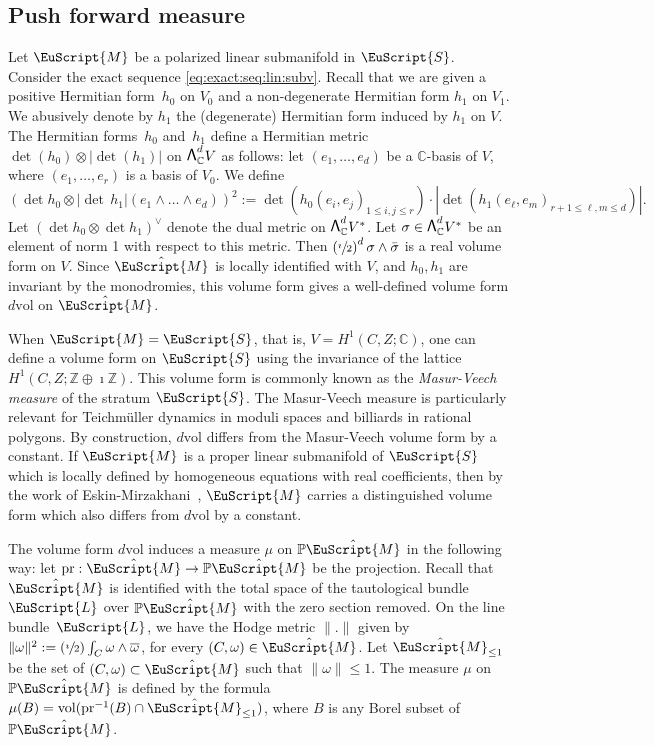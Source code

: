 \documentclass[10pt]{amsart}
\let\mathcal\EuScript
\newcommand\bw{{\hbox{\large$\mathsf{\Lambda}$}}}
\newcommand{\Psfrac}[2]{(\sfrac{#1}{#2})}
\theoremstyle{plain}
\theoremstyle{definition}
\def\C{\mathbb{C}}
\newcommand\Z{\mathbb{Z}}
\newcommand{\Pb}{\mathbb{P}}
\newcommand{\cL}{\mathcal{L}}
\newcommand{\cM}{\mathcal{M}}
\newcommand{\cS}{\mathcal{S}}
\newcommand{\vol}{\mathrm{vol}}
\newcommand{\pr}{\mathrm{pr}}
\let\omg\omega
\let\ol\overline
\begin{document}
\subsection{Push forward measure}\label{sec:push:measure}
Let $\cM$ be a polarized linear submanifold in $\cS$.
Consider the exact sequence \eqref{eq:exact:seq:lin:subv}.
Recall that we are given a positive Hermitian form~$h_0$ on $V_0$ and a non-degenerate Hermitian form $h_1$ on $V_1$. We abusively denote by $h_1$ the (degenerate) Hermitian form induced by $h_1$ on $V$.
The Hermitian forms~$h_0$ and~$h_1$ define a Hermitian metric $\det(h_0)\otimes|{\det}(h_1)|$ on $\bw^d_\C V$ as follows: let $(e_1,\dots,e_d)$ be a $\C$-basis of $V$, where $(e_1,\dots,e_r)$ is a basis of $V_0$. We define
\[
(\det h_0\otimes|{\det\,} h_1|(e_1\wedge\dots\wedge e_d))^2:=\det(h_0(e_i,e_j)_{1\leq i,j\leq r})\cdot|{\det}(h_1(e_\ell,e_m)_{r+1\leq \ell,m\leq d})|.
\]
Let $(\det h_0\otimes \det h_1)^\vee$ denote the dual metric on $\bw^d_\C V^*$.
Let $\sigma \in \bw^d_\C V^*$ be an element of norm 1 with respect to this metric.
Then $\left(\sfrac{\imath}{2}\right)^d\sigma\wedge\bar{\sigma}$ is a real volume form on $V$.
Since $\hat{\cM}$ is locally identified with $V$, and $h_0,h_1$ are invariant by the monodromies, this volume form gives a well-defined volume form $d\vol$ on $\hat{\cM}$.

When $\cM=\cS$, that is, $V=H^1(C,Z;\C)$, one can define a volume form on $\cS$ using the invariance of the lattice $H^1(C,Z;\Z\oplus\imath\Z)$.
This volume form is commonly known as the \emph{Masur-Veech measure} of the stratum $\cS$.
The Masur-Veech measure is particularly relevant for Teichmüller dynamics in moduli spaces and billiards in rational polygons.
By construction, $d\vol$ differs from the Masur-Veech volume form by a constant.
If $\cM$ is a proper linear submanifold of $\cS$ which is locally defined by homogeneous equations with real coefficients, then by the work of Eskin-Mirzakhani~\cite{EM18}, $\cM$ carries a distinguished volume form which also differs from $d\vol$ by a constant.

The volume form $d\vol$ induces a measure $\mu$ on $\Pb\hat\cM$ in the following way: let $\pr:\hat\cM\to\Pb\hat\cM$ be the projection.
Recall that $\hat\cM$ is identified with the total space of the tautological bundle $\cL$ over $\Pb\hat\cM$ with the zero section removed. On the line bundle~$\cL$, we have the Hodge metric $\|.\|$ given by $ \|\omg\|^2:=\Psfrac{\imath}{2}\int_C\omg\wedge\ol{\omg}$, for every $(C,\omg) \in \hat{\cM}$.
Let $\hat\cM_{\leq 1}$ be the set of $(C,\omg) \subset\hat\cM$ such that $\|\omg\| \leq 1$.
The measure $\mu$ on $\Pb\hat\cM$ is defined by the formula $\mu(B)=\vol(\pr^{-1}(B)\cap \hat\cM_{\leq 1})$, where $B$ is any Borel subset of~$\Pb\hat\cM$.
\end{document}
